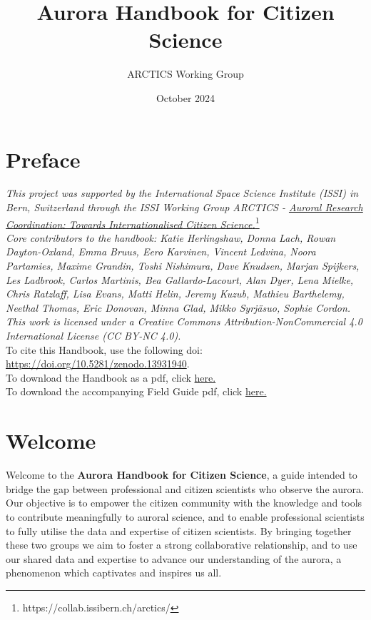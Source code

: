 \documentclass{article}
\title{Aurora Handbook for Citizen Science}
\author{ARCTICS Working Group}
\date{October 2024}
\newcommand{\contributed}[1]{%
    \par\noindent
    \begingroup
    \setlength{\leftskip}{1em}%
    \itshape
    Contributors: #1
    \par
    \endgroup
    \vspace{0.5em}
}
\begin{document}
\maketitle
\tableofcontents
\newpage

\section{Preface}
\textit{This project was supported by the International Space Science Institute (ISSI) in Bern, Switzerland through the ISSI Working Group ARCTICS - \href{https://collab.issibern.ch/arctics/}{Auroral Research Coordination: Towards Internationalised Citizen Science.}}\footnote{https://collab.issibern.ch/arctics/}\\
\textit{Core contributors to the handbook: Katie Herlingshaw, Donna Lach, Rowan Dayton-Oxland, Emma Bruus, Eero Karvinen, Vincent Ledvina, Noora Partamies, Maxime Grandin, Toshi Nishimura, Dave Knudsen, Marjan Spijkers, Les Ladbrook, Carlos Martinis, Bea Gallardo-Lacourt, Alan Dyer, Lena Mielke, Chris Ratzlaff, Lisa Evans, Matti Helin, Jeremy Kuzub, Mathieu Barthelemy, Neethal Thomas, Eric Donovan, Minna Glad, Mikko Syrjäsuo, Sophie Cordon.}\\
\textit{This work is licensed under a Creative Commons Attribution-NonCommercial 4.0 International License (CC BY-NC 4.0).}\\
To cite this Handbook, use the following doi: \url{https://doi.org/10.5281/zenodo.13931940}.\\
To download the Handbook as a pdf, click \href{https://kherli.github.io/Aurora-Field-Guide-And-Handbook/_static/Aurora_Handbook.pdf}{here.}\\
To download the accompanying Field Guide pdf, click \href{https://kherli.github.io/Aurora-Field-Guide-And-Handbook/_static/Aurora_Field_Guide.pdf}{here.}

 
\section{Welcome}
Welcome to the {\bf Aurora Handbook for Citizen Science}, a guide intended to bridge the gap between professional and citizen scientists who observe the aurora. Our objective is to empower the citizen community with the knowledge and tools to contribute meaningfully to auroral science, and to enable professional scientists to fully utilise the data and expertise of citizen scientists. By bringing together these two groups we aim to foster a strong collaborative relationship, and to use our shared data and expertise to advance our understanding of the aurora, a phenomenon which captivates and inspires us all. 
\end{document}
